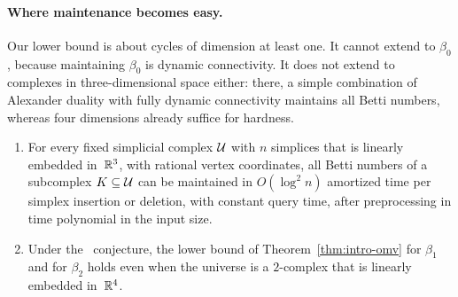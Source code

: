 \paragraph{Where maintenance becomes easy.}
Our lower bound is about cycles of dimension at least one.
It cannot extend to $\beta_0$, because maintaining $\beta_0$ is dynamic connectivity.
It does not extend to complexes in three-dimensional space either: there, a simple combination of Alexander duality with fully dynamic connectivity maintains all Betti numbers, whereas four dimensions already suffice for hardness.

\begin{theorem}\label{thm:intro-dichotomy}
\leavevmode
\begin{enumerate}[label=(\roman*)]
\item For every fixed simplicial complex $\mathcal{U}$ with $n$ simplices that is linearly embedded in~$\mathbb{R}^3$, with rational vertex coordinates, all Betti numbers of a subcomplex $K\subseteq\mathcal{U}$ can be maintained in $O(\log^2 n)$ amortized time per simplex insertion or deletion, with constant query time, after preprocessing in time polynomial in the input size.
\item Under the \OMv\ conjecture, the lower bound of Theorem~\ref{thm:intro-omv} for $\beta_1$ and for $\beta_2$ holds even when the universe is a $2$-complex that is linearly embedded in~$\mathbb{R}^4$.
\end{enumerate}
\end{theorem}

